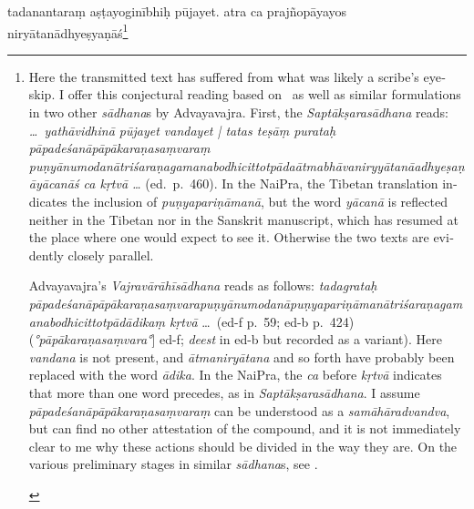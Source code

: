 \documentclass[naipra.tex]{subfiles}
\begin{document}
\begin{sanskrit}
\pstart
tadanantaraṃ  aṣṭayoginībhiḥ pūjayet.
atra ca prajñopāyayos niryātanādhyeṣyaṇāś\footnote{
	\begin{english}%
		Here the transmitted text has suffered from what was likely a scribe's eyeskip.
		I offer this conjectural reading based on \TIB\ as well as similar formulations in two other \emph{sādhana}s by Advayavajra.
		First, the \emph{Saptākṣarasādhana} reads: \emph{\ldots\ yathāvidhinā pūjayet vandayet | tatas teṣāṃ purataḥ pāpadeśanāpāpākaraṇasaṃvaraṃ puṇyānumodanātriśaraṇagamanabodhicittotpāda\dsh ātmabhāvaniryyātanā\dsh adhyeṣaṇāyācanāś ca kṛtvā \ldots } (ed.\ p.\ 460).
		In the NaiPra, the Tibetan translation indicates the inclusion of \emph{puṇyapariṇāmanā}, but the word \emph{yācanā} is reflected neither in the Tibetan nor in the Sanskrit manuscript, which has resumed at the place where one would expect to see it.
		Otherwise the two texts are evidently closely parallel.

		Advayavajra's \emph{Vajravārāhīsādhana} reads as follows: \emph{tadagrataḥ pāpadeśanāpāpākaraṇasaṃvarapuṇyānumodanāpuṇyapariṇāmanātriśaraṇagamanabodhicittotpādādikaṃ kṛtvā} \ldots\ (ed-f p.\ 59; ed-b p.\ 424) (\emph{°pāpākaraṇasaṃvara°}] ed-f; \emph{deest} in ed-b but recorded as a variant).
		Here \emph{vandana} is not present, and \emph{ātmaniryātana} and so forth have probably been replaced with the word \emph{ādika}.
		In the NaiPra, the \emph{ca} before \emph{kṛtvā} indicates that more than one word precedes, as in \emph{Saptākṣarasādhana}.
		I assume \emph{pāpadeśanāpāpākaraṇasaṃvaraṃ} can be understood as a \emph{samāhāradvandva}, but can find no other attestation of the compound, and it is not immediately clear to me why these actions should be divided in the way they are.
		On the various preliminary stages in similar \emph{sādhana}s, see \textcite[122–124]{english2002}.


\end{english}}
\end{sanskrit}
\end{document}
